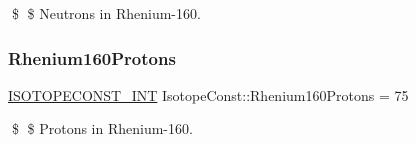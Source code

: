 \$ \$ Neutrons in Rhenium-\/160. \mbox{\label{group___isotope_const-_rhenium-_re160_gae52852ace034053523a6bb3f3163488b}} 
\subsubsection{\texorpdfstring{Rhenium160\+Protons}{Rhenium160Protons}}
{\footnotesize\ttfamily \mbox{\hyperlink{group___isotope_const-_macros_ga5f18360b3e99483a35c32d789e62621c}{I\+S\+O\+T\+O\+P\+E\+C\+O\+N\+S\+T\+\_\+\+I\+NT}} Isotope\+Const\+::\+Rhenium160\+Protons = 75}

\$ \$ Protons in Rhenium-\/160. 